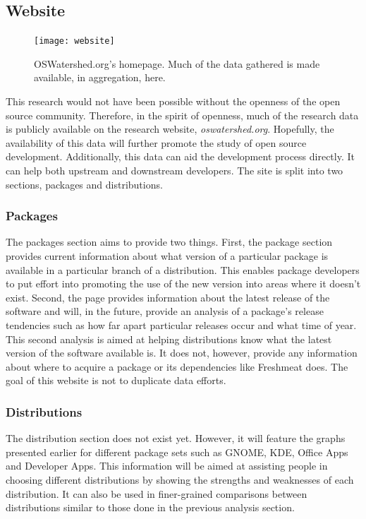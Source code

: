 \documentclass[letterpaper,10pt]{article}
\begin{document}
\subsection{Website}
\begin{figure}[htb]
\texttt{[image: website]}
\caption{OSWatershed.org's homepage.  Much of the data gathered is made available, in aggregation, here.}
\label{fig:website}
\end{figure}
This research would not have been possible without the openness of the open source community.  Therefore, in the spirit of openness, much of the research data is publicly available on the research website, \emph{oswatershed.org}.  Hopefully, the availability of this data will further promote the study of open source development.  Additionally, this data can aid the development process directly.  It can help both upstream and downstream developers.  The site is split into two sections, packages and distributions.
\subsubsection{Packages}
The packages section aims to provide two things.  First, the package section provides current information about what version of a particular package is available in a particular branch of a distribution.  This enables package developers to put effort into promoting the use of the new version into areas where it doesn't exist.  Second, the page provides information about the latest release of the software and will, in the future, provide an analysis of a package's release tendencies such as how far apart particular releases occur and what time of year.  This second analysis is aimed at helping distributions know what the latest version of the software available is.  It does not, however, provide any information about where to acquire a package or its dependencies like Freshmeat does.  The goal of this website is not to duplicate data efforts.
\subsubsection{Distributions}
The distribution section does not exist yet.  However, it will feature the graphs presented earlier for different package sets such as GNOME, KDE, Office Apps and Developer Apps.  This information will be aimed at assisting people in choosing different distributions by showing the strengths and weaknesses of each distribution.  It can also be used in finer-grained comparisons between distributions similar to those done in the previous analysis section.
\end{document}
